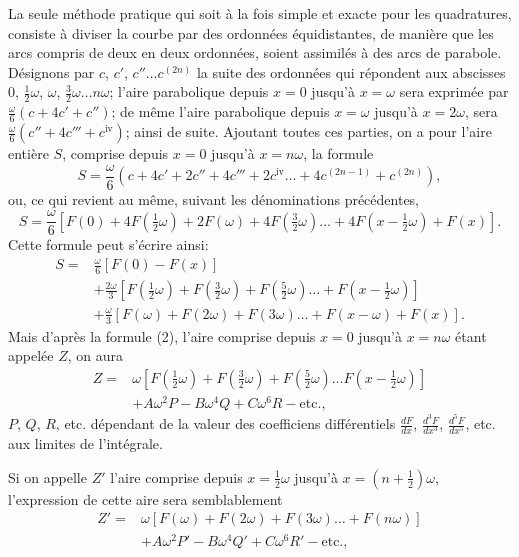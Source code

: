 \documentclass{article}
\begin{document}
La seule méthode pratique qui soit à la fois simple et exacte pour les quadratures, consiste à diviser la courbe par des ordonnées équidistantes, de manière que les arcs compris de deux en deux ordonnées, soient assimilés à des arcs de parabole. Désignons par $c$, $c'$, $c''\ldots c^{(2n)}$ la suite des ordonnées qui répondent aux abscisses $0$, $\frac{1}{2}\omega$, $\omega$, $\frac{3}{2}\omega\ldots n\omega$; l'aire parabolique depuis $x=0$ jusqu'à $x=\omega$ sera exprimée par $\frac{\omega}{6}(c+4c'+c'')$; de même l'aire parabolique depuis $x=\omega$ jusqu'à $x=2\omega$, sera $\frac{\omega}{6}(c''+4c'''+c^{\text{iv}})$; ainsi de suite. Ajoutant toutes ces parties, on a pour l'aire entière $S$, comprise depuis $x=0$ jusqu'à $x=n\omega$, la formule
\[ S=\frac{\omega}{6}(c+4c'+2c''+4c'''+2c^{\text{iv}}\ldots+4c^{(2n-1)}+c^{(2n)}), \tag{3} \]
ou, ce qui revient au même, suivant les dénominations précédentes,
\[ S=\frac{\omega}{6}[F(0)+4F(\tfrac{1}{2}\omega)+2F(\omega)+4F(\tfrac{3}{2}\omega)\ldots+4F(x-\tfrac{1}{2}\omega)+F(x)]. \]
Cette formule peut s'écrire ainsi:
\[ \begin{aligned} S={}&\frac{\omega}{6}[F(0)-F(x)]\\ &+\frac{2\omega}{3}[F(\tfrac{1}{2}\omega)+F(\tfrac{3}{2}\omega)+F(\tfrac{5}{2}\omega)\ldots+F(x-\tfrac{1}{2}\omega)]\\ &+\frac{\omega}{3}[F(\omega)+F(2\omega)+F(3\omega)\ldots+F(x-\omega)+F(x)]. \end{aligned} \]
Mais d'après la formule (2), l'aire comprise depuis $x=0$ jusqu'à $x=n\omega$ étant appelée $Z$, on aura
\[ \begin{aligned} Z={}&\omega[F(\tfrac{1}{2}\omega)+F(\tfrac{3}{2}\omega)+F(\tfrac{5}{2}\omega)\ldots F(x-\tfrac{1}{2}\omega)]\\ &+A\omega^{2}P-B\omega^{4}Q+C\omega^{6}R-\text{etc.}, \end{aligned} \]
$P$, $Q$, $R$, etc. dépendant de la valeur des coefficiens différentiels $\frac{dF}{dx}$, $\frac{d^{3}F}{dx^{3}}$, $\frac{d^{5}F}{dx^{5}}$, etc. aux limites de l'intégrale.

Si on appelle $Z'$ l'aire comprise depuis $x=\frac{1}{2}\omega$ jusqu'à $x=(n+\frac{1}{2})\omega$, l'expression de cette aire sera semblablement
\[ \begin{aligned} Z'={}&\omega[F(\omega)+F(2\omega)+F(3\omega)\ldots+F(n\omega)]\\ &+A\omega^{2}P'-B\omega^{4}Q'+C\omega^{6}R'-\text{etc.}, \end{aligned} \]
\end{document}
